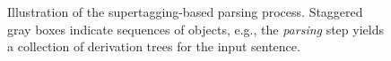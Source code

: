\documentclass[../document.tex]{subfiles}
\begin{document}
    \begin{figure}
        
        \caption{\label{fig:parsing:overview}
            Illustration of the supertagging-based parsing process.
            Staggered gray boxes indicate sequences of objects, e.g.\@, the \emph{parsing} step yields a collection of derivation trees for the input sentence.
        }
    \end{figure}

    
    
    
    
    \ifSubfilesClassLoaded{%
        \printindex
    }{}
\end{document}
